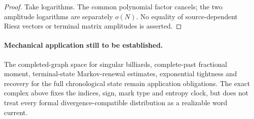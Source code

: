 \begin{proof}
Take logarithms. The common polynomial factor cancels; the two amplitude logarithms are separately $o(N)$. No equality of source-dependent Riesz vectors or terminal matrix amplitudes is asserted.
\end{proof}

\paragraph{Mechanical application still to be established.}
The completed-graph space for singular billiards, complete-past fractional moment, terminal-state Markov-renewal estimates, exponential tightness and recovery for the full chronological state remain application obligations. The exact complex above fixes the indices, sign, mark type and entropy clock, but does not treat every formal divergence-compatible distribution as a realizable word current.

